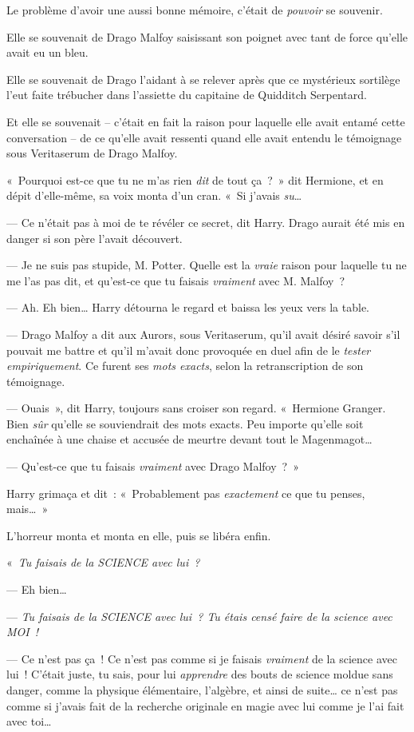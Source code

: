 Le problème d'avoir une aussi bonne mémoire, c'était de \emph{pouvoir} se souvenir.

Elle se souvenait de Drago Malfoy saisissant son poignet avec tant de force qu'elle avait eu un bleu.

Elle se souvenait de Drago l'aidant à se relever après que ce mystérieux sortilège l'eut faite trébucher dans l'assiette du capitaine de Quidditch Serpentard.

Et elle se souvenait -- c'était en fait la raison pour laquelle elle avait entamé cette conversation -- de ce qu'elle avait ressenti quand elle avait entendu le témoignage sous Veritaserum de Drago Malfoy.

«~Pourquoi est-ce que tu ne m'as rien \emph{dit} de tout ça~?~» dit Hermione, et en dépit d'elle-même, sa voix monta d'un cran. «~Si j'avais \emph{su}…

--- Ce n'était pas à moi de te révéler ce secret, dit Harry. Drago aurait été mis en danger si son père l'avait découvert.

--- Je ne suis pas stupide, M. Potter. Quelle est la \emph{vraie} raison pour laquelle tu ne me l'as pas dit, et qu'est-ce que tu faisais \emph{vraiment} avec M. Malfoy~?

--- Ah. Eh bien… Harry détourna le regard et baissa les yeux vers la table.

--- Drago Malfoy a dit aux Aurors, sous Veritaserum, qu'il avait désiré savoir s'il pouvait me battre et qu'il m'avait donc provoquée en duel afin de le \emph{tester empiriquement}. Ce furent ses \emph{mots exacts}, selon la retranscription de son témoignage.

--- Ouais~», dit Harry, toujours sans croiser son regard. «~Hermione Granger. Bien \emph{sûr} qu'elle se souviendrait des mots exacts. Peu importe qu'elle soit enchaînée à une chaise et accusée de meurtre devant tout le Magenmagot…

--- Qu'est-ce que tu faisais \emph{vraiment} avec Drago Malfoy~?~»

Harry grimaça et dit~: «~Probablement pas \emph{exactement} ce que tu penses, mais…~»

L'horreur monta et monta en elle, puis se libéra enfin.

«~\emph{Tu faisais de la SCIENCE avec lui~?}

--- Eh bien…

--- \emph{Tu faisais de la SCIENCE avec lui~? Tu étais censé faire de la science avec MOI~!}

--- Ce n'est pas ça~! Ce n'est pas comme si je faisais \emph{vraiment} de la science avec lui~! C'était juste, tu sais, pour lui \emph{apprendre} des bouts de science moldue sans danger, comme la physique élémentaire, l'algèbre, et ainsi de suite… ce n'est pas comme si j'avais fait de la recherche originale en magie avec lui comme je l'ai fait avec toi…

